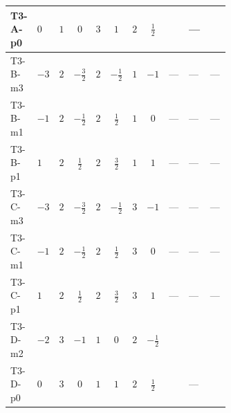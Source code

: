 \documentclass[8pt]{article}
\begin{document}
\begin{landscape}
\begin{longtable}{@{}llcccccc >{\raggedright\arraybackslash}p{0.21\linewidth} >{\raggedright\arraybackslash}p{0.21\linewidth} >{\raggedright\arraybackslash}p{0.21\linewidth}@{}}
\midrule
T3-A-p0 & $0$ & $1$ & $0$ & $3$ & $1$ & $2$ & $\frac{1}{2}$ & \scriptsize\adjustbox{max width=\linewidth}{$\begin{gathered} -\frac{9 {g_2}^2 {\lambda_{HS_1}^{(1)}}}{2}\end{gathered}$} & --- & \scriptsize\adjustbox{max width=\linewidth}{$\begin{gathered} -\frac{3 {g_1}^2 {\lambda_{HS_1}^{(1)}}}{2}\end{gathered}$} \\
\midrule
T3-B-m3 & $-3$ & $2$ & $-\frac{3}{2}$ & $2$ & $-\frac{1}{2}$ & $1$ & $-1$ & --- & --- & --- \\
\midrule
T3-B-m1 & $-1$ & $2$ & $-\frac{1}{2}$ & $2$ & $\frac{1}{2}$ & $1$ & $0$ & --- & --- & --- \\
\midrule
T3-B-p1 & $1$ & $2$ & $\frac{1}{2}$ & $2$ & $\frac{3}{2}$ & $1$ & $1$ & --- & --- & --- \\
\midrule
T3-C-m3 & $-3$ & $2$ & $-\frac{3}{2}$ & $2$ & $-\frac{1}{2}$ & $3$ & $-1$ & --- & --- & --- \\
\midrule
T3-C-m1 & $-1$ & $2$ & $-\frac{1}{2}$ & $2$ & $\frac{1}{2}$ & $3$ & $0$ & --- & --- & --- \\
\midrule
T3-C-p1 & $1$ & $2$ & $\frac{1}{2}$ & $2$ & $\frac{3}{2}$ & $3$ & $1$ & --- & --- & --- \\
\midrule
T3-D-m2 & $-2$ & $3$ & $-1$ & $1$ & $0$ & $2$ & $-\frac{1}{2}$ & \scriptsize\adjustbox{max width=\linewidth}{$\begin{gathered} -\frac{33 {g_2}^2 {\lambda_{HS_1}^{(1)}}}{2}\end{gathered}$} & \scriptsize\adjustbox{max width=\linewidth}{$\begin{gathered} +3 {g_1}^4\end{gathered}$} & \scriptsize\adjustbox{max width=\linewidth}{$\begin{gathered} -\frac{15 {g_1}^2 {\lambda_{HS_1}^{(1)}}}{2}\end{gathered}$} \\
\midrule
T3-D-p0 & $0$ & $3$ & $0$ & $1$ & $1$ & $2$ & $\frac{1}{2}$ & \scriptsize\adjustbox{max width=\linewidth}{$\begin{gathered} -\frac{33 {g_2}^2 {\lambda_{HS_1}^{(1)}}}{2}\end{gathered}$} & --- & \scriptsize\adjustbox{max width=\linewidth}{$\begin{gathered} -\frac{3 {g_1}^2 {\lambda_{HS_1}^{(1)}}}{2}\end{gathered}$} \\

\end{longtable}
\end{landscape}
\end{document}
